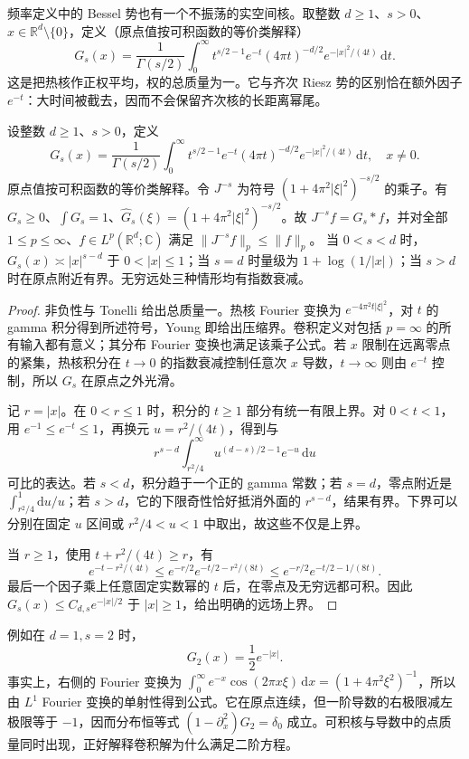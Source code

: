 频率定义中的 Bessel 势也有一个不振荡的实空间核。取整数 \(d\ge1\)、\(s>0\)、\(x\in\mathbb R^d\setminus\{0\}\)，定义（原点值按可积函数的等价类解释）
\[
 G_s(x)=\frac1{\Gamma(s/2)}
 \int_0^\infty t^{s/2-1}e^{-t}
 (4\pi t)^{-d/2}e^{-|x|^2/(4t)}\,\mathrm dt.
\]
这是把热核作正权平均，权的总质量为一。它与齐次 Riesz 势的区别恰在额外因子 \(e^{-t}\)：大时间被截去，因而不会保留齐次核的长距离幂尾。
\begin{proposition}\label{b2:prop:22-bessel-kernel}
设整数 \(d\geq1\)、\(s>0\)，定义
\[
 G_s(x)=\frac1{\Gamma(s/2)}
 \int_0^\infty t^{s/2-1}e^{-t}
 (4\pi t)^{-d/2}e^{-|x|^2/(4t)}\,\mathrm dt,
 \quad x\ne0.
\]
原点值按可积函数的等价类解释。令 \(J^{-s}\) 为符号 \((1+4\pi^2|\xi|^2)^{-s/2}\) 的乘子。有 \(G_s\geq0\)、\(\int G_s=1\)、\(\widehat G_s(\xi)=(1+4\pi^2|\xi|^2)^{-s/2}\)。故 \(J^{-s}f=G_s*f\)，并对全部 \(1\leq p\leq\infty\)、\(f\in L^p(\mathbb R^d;\mathbb C)\) 满足 \(\|J^{-s}f\|_p\leq\|f\|_p\)。
当 \(0<s<d\) 时，\(G_s(x)\asymp |x|^{s-d}\) 于 \(0<|x|\leq1\)；当 \(s=d\) 时量级为 \(1+\log(1/|x|)\)；当 \(s>d\) 时在原点附近有界。无穷远处三种情形均有指数衰减。
\end{proposition}
\begin{proof}
非负性与 Tonelli 给出总质量一。热核 Fourier 变换为 \(e^{-4\pi^2t|\xi|^2}\)，对 \(t\) 的 gamma 积分得到所述符号，Young 即给出压缩界。卷积定义对包括 \(p=\infty\) 的所有输入都有意义；其分布 Fourier 变换也满足该乘子公式。若 \(x\) 限制在远离零点的紧集，热核积分在 \(t\to0\) 的指数衰减控制任意次 \(x\) 导数，\(t\to\infty\) 则由 \(e^{-t}\) 控制，所以 \(G_s\) 在原点之外光滑。

记 \(r=|x|\)。在 \(0<r\leq1\) 时，积分的 \(t\geq1\) 部分有统一有限上界。对 \(0<t<1\)，用 \(e^{-1}\leq e^{-t}\leq1\)，再换元 \(u=r^2/(4t)\)，得到与
\[
 r^{s-d}\int_{r^2/4}^\infty
 u^{(d-s)/2-1}e^{-u}\,\mathrm du
\]
可比的表达。若 \(s<d\)，积分趋于一个正的 gamma 常数；若 \(s=d\)，零点附近是 \(\int_{r^2/4}^1\mathrm du/u\)；若 \(s>d\)，它的下限奇性恰好抵消外面的 \(r^{s-d}\)，结果有界。下界可以分别在固定 \(u\) 区间或 \(r^2/4<u<1\) 中取出，故这些不仅是上界。

当 \(r\geq1\)，使用 \(t+r^2/(4t)\geq r\)，有
\[
 e^{-t-r^2/(4t)}
 \leq e^{-r/2}e^{-t/2-r^2/(8t)}
 \leq e^{-r/2}e^{-t/2-1/(8t)}.
\]
最后一个因子乘上任意固定实数幂的 \(t\) 后，在零点及无穷远都可积。因此
\(G_s(x)\leq C_{d,s}e^{-|x|/2}\) 于 \(|x|\geq1\)，给出明确的远场上界。
\end{proof}
例如在 \(d=1,s=2\) 时，
\[
 G_2(x)=\frac12e^{-|x|}.
\]
事实上，右侧的 Fourier 变换为
\(\int_0^\infty e^{-x}\cos(2\pi x\xi)\,\mathrm dx
=(1+4\pi^2\xi^2)^{-1}\)，所以由 \(L^1\) Fourier 变换的单射性得到公式。它在原点连续，但一阶导数的右极限减左极限等于 \(-1\)，因而分布恒等式
\((1-\partial_x^2)G_2=\delta_0\) 成立。可积核与导数中的点质量同时出现，正好解释卷积解为什么满足二阶方程。

